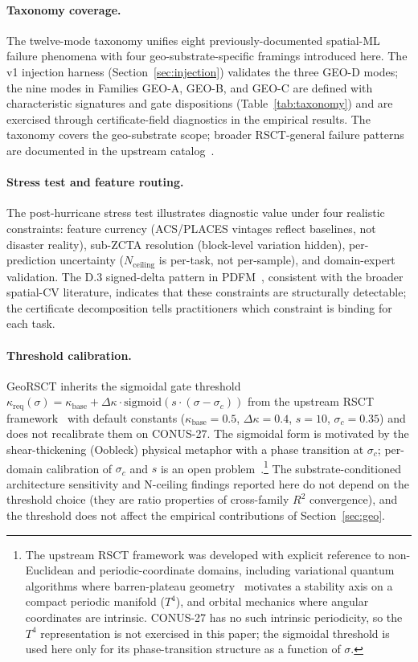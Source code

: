 \documentclass{article}
\begin{document}
\paragraph{Taxonomy coverage.} The twelve-mode taxonomy unifies eight previously-documented spatial-ML failure phenomena with four geo-substrate-specific framings introduced here. The v1 injection harness (Section~\ref{sec:injection}) validates the three GEO-D modes; the nine modes in Families GEO-A, GEO-B, and GEO-C are defined with characteristic signatures and gate dispositions (Table~\ref{tab:taxonomy}) and are exercised through certificate-field diagnostics in the empirical results. The taxonomy covers the geo-substrate scope; broader RSCT-general failure patterns are documented in the upstream catalog~\citep{martin2026rsct}.

\paragraph{Stress test and feature routing.}
The post-hurricane stress test illustrates diagnostic value under four realistic constraints: feature currency (ACS/PLACES vintages reflect baselines, not disaster reality), sub-ZCTA resolution (block-level variation hidden), per-prediction uncertainty ($N_{\text{ceiling}}$ is per-task, not per-sample), and domain-expert validation. The D.3 signed-delta pattern in PDFM~\citep[Table~4]{agarwal2025pdfm}, consistent with the broader spatial-CV literature, indicates that these constraints are structurally detectable; the certificate decomposition tells practitioners which constraint is binding for each task.

\paragraph{Threshold calibration.} GeoRSCT inherits the sigmoidal gate threshold $\kappa_{\text{req}}(\sigma) = \kappa_{\text{base}} + \Delta\kappa \cdot \mathrm{sigmoid}(s \cdot (\sigma - \sigma_c))$ from the upstream RSCT framework~\citep{martin2026rsct} with default constants ($\kappa_{\text{base}}{=}0.5$, $\Delta\kappa{=}0.4$, $s{=}10$, $\sigma_c{=}0.35$) and does not recalibrate them on CONUS-27. The sigmoidal form is motivated by the shear-thickening (Oobleck) physical metaphor with a phase transition at $\sigma_c$; per-domain calibration of $\sigma_c$ and $s$ is an open problem~\citep[\S8.3]{martin2026rsct}.\footnote{The upstream RSCT framework was developed with explicit reference to non-Euclidean and periodic-coordinate domains, including variational quantum algorithms where barren-plateau geometry~\citep{mcclean2018barren,larocca2025barren} motivates a stability axis on a compact periodic manifold ($T^4$), and orbital mechanics where angular coordinates are intrinsic. CONUS-27 has no such intrinsic periodicity, so the $T^4$ representation is not exercised in this paper; the sigmoidal threshold is used here only for its phase-transition structure as a function of $\sigma$.} The substrate-conditioned architecture sensitivity and N-ceiling findings reported here do not depend on the threshold choice (they are ratio properties of cross-family $R^2$ convergence), and the threshold does not affect the empirical contributions of Section~\ref{sec:geo}.
\end{document}
